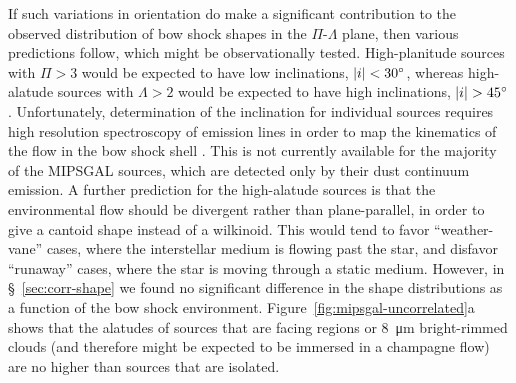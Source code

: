 If such variations in orientation do make a significant contribution
to the observed distribution of bow shock shapes in the
\(\Pi\)-\(\Lambda\) plane, then various predictions follow, which might be
observationally tested.  High-planitude sources with \(\Pi > 3\) would
be expected to have low inclinations, \(\lvert i\rvert < \ang{30}\), whereas
high-alatude sources with \(\Lambda > 2\) would be expected to have high
inclinations, \(\lvert i\rvert > \ang{45}\).  Unfortunately, determination of
the inclination for individual sources requires high resolution
spectroscopy of emission lines in order to map the kinematics of the
flow in the bow shock shell \citep[e.g.,][]{Henney:2013a}.  This is
not currently available for the majority of the MIPSGAL sources, which
are detected only by their dust continuum emission.  A further
prediction for the high-alatude sources is that the environmental flow
should be divergent rather than plane-parallel, in order to give a
cantoid shape instead of a wilkinoid.  This would tend to favor
``weather-vane'' cases, where the interstellar medium is flowing past
the star, and disfavor ``runaway'' cases, where the star is moving
through a static medium.  However, in \S~\ref{sec:corr-shape} we found
no significant difference in the shape distributions as a function of
the bow shock environment.  Figure~\ref{fig:mipsgal-uncorrelated}a
shows that the alatudes of sources that are facing \hii{} regions or
\SI{8}{\um} bright-rimmed clouds (and therefore might be expected to
be immersed in a champagne flow) are no higher than sources that are
isolated.



